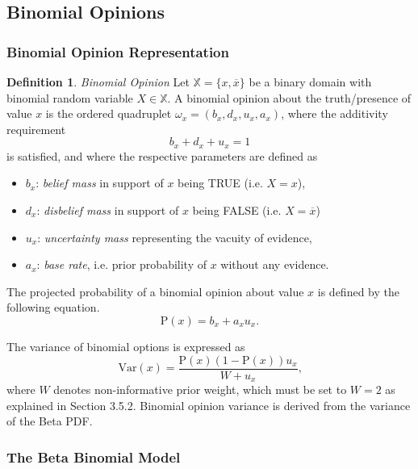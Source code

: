 \documentclass[a4paper,12pt]{article}
\theoremstyle{definition}
\newtheorem{definition}{Definition}[section]
\numberwithin{equation}{section}
\begin{document}
\subsection{Binomial Opinions}

\subsubsection{Binomial Opinion Representation}

\begin{definition}
	\emph{Binomial Opinion} Let $\mathbb{X} = \{x, \overline{x}\}$ be a binary domain with binomial random variable $X \in \mathbb{X}$. A binomial opinion about the truth/presence of value $x$ is the ordered quadruplet $\omega_x = \left(b_x, d_x, u_x, a_x\right)$, where the additivity requirement
	\begin{equation}
		b_x + d_x + u_x = 1
	\end{equation}
	is satisfied, and where the respective parameters are defined as
	\begin{itemize}
		\item $b_x$: \emph{belief mass} in support of $x$ being TRUE (i.e. $X = x$),
		\item $d_x$: \emph{disbelief mass} in support of $x$ being FALSE (i.e. $X = \overline{x}$)
		\item $u_x$: \emph{uncertainty mass} representing the vacuity of evidence,
		\item $a_x$: \emph{base rate}, i.e. prior probability of $x$ without any evidence.
	\end{itemize}
\end{definition}

The projected probability of a binomial opinion about value $x$ is defined by the following equation.
\begin{equation}
	\mathrm{P}(x) = b_x + a_x u_x\text{.}
\end{equation}

The variance of binomial options is expressed as
\begin{equation}
	\mathrm{Var}(x) = \dfrac{\mathrm{P}(x)(1 - \mathrm{P}(x))u_x}{W + u_x}\text{,}
\end{equation}
where $W$ denotes non-informative prior weight, which must be set to $W = 2$ as explained in Section 3.5.2. Binomial opinion variance is derived from the variance of the Beta PDF.

\subsubsection{The Beta Binomial Model}
\end{document}
